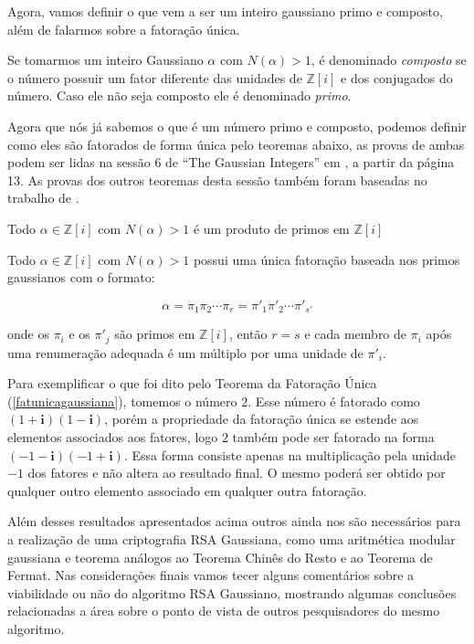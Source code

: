 Agora, vamos definir o que vem a ser um inteiro gaussiano primo e composto, al\'em de falarmos sobre a fatora\c{c}\~ao \'unica.

\begin{Df}
Se tomarmos um inteiro Gaussiano $\alpha$ com $N(\alpha) > 1$, \'e denominado \textit{composto} se o n\'umero possuir um fator diferente das unidades de $\mathbb{Z}[i]$ e dos conjugados do n\'umero. Caso ele n\~ao seja composto ele \'e denominado \textit{primo}.
\end{Df}

Agora que n\'os j\'a sabemos o que \'e um n\'umero primo e composto, podemos definir como eles s\~ao fatorados de forma \'unica pelo teoremas abaixo, as provas de ambas podem ser lidas na sess\~ao 6 de ``The Gaussian Integers'' em \cite{conrad}, a partir da p\'agina 13. As provas dos outros teoremas desta sess\~ao tamb\'em foram baseadas no trabalho de \cite{conrad}.

\begin{Th}
 Todo $\alpha \in \mathbb{Z}[i]$ com $N(\alpha) > 1$ \'e um produto de primos em $\mathbb{Z}[i]$
\end{Th}

\begin{Th} \label{fatunicagaussiana}
 Todo $\alpha \in \mathbb{Z}[i]$ com $N(\alpha) > 1$ possui uma \'unica fatora\c{c}\~ao baseada nos primos gaussianos com o formato:

	$$\alpha = \pi_1 \pi_2 \cdots \pi_{r} = \pi'_1 \pi'_2 \cdots \pi'_{s'} $$

onde os $\pi_i$ e os $\pi'_j$ s\~ao primos em $\mathbb{Z}[i]$, ent\~ao $r=s$ e cada membro de $\pi_i$ ap\'os uma renumera\c{c}\~ao adequada \'e um m\'ultiplo por uma unidade de $\pi'_i$.

\end{Th}

Para exemplificar o que foi dito pelo Teorema da Fatora\c{c}\~ao \'Unica (\ref{fatunicagaussiana}), tomemos o n\'umero $2$. Esse n\'umero \'e fatorado como $(1 + \textbf{i})(1 - \textbf{i})$, por\'em a propriedade da fatora\c{c}\~ao \'unica se estende aos elementos associados aos fatores, logo $2$ tamb\'em pode ser fatorado na forma $(-1 - \textbf{i})(-1 + \textbf{i})$. Essa forma consiste apenas na multiplica\c{c}\~ao pela unidade $-1$ dos fatores e n\~ao altera ao resultado final. O mesmo poder\'a ser obtido por qualquer outro elemento associado em qualquer outra fatora\c{c}\~ao.

Al\'em desses resultados apresentados acima outros ainda nos s\~ao necess\'arios para a realiza\c{c}\~ao de uma criptografia RSA Gaussiana, como uma aritm\'etica modular gaussiana e teorema an\'alogos ao Teorema Chin\^es do Resto e ao Teorema de Fermat. Nas considerações finais vamos tecer alguns comentários sobre a viabilidade ou n\~ao do algoritmo RSA Gaussiano, mostrando algumas conclusões relacionadas a \'area sobre o ponto de vista de outros pesquisadores do mesmo algoritmo.